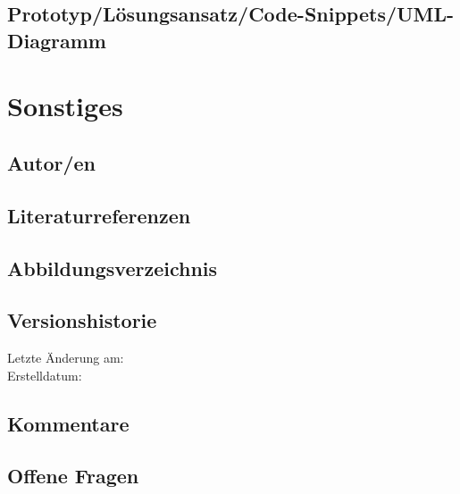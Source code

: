 \technologyOrientationDesc 

\subsection*{Prototyp/Lösungsansatz/Code-Snippets/UML-Diagramm}
\prototype

\begin{figure}[H]
\end{figure}

\begin{figure}[H]
\end{figure}

\begin{figure}[H]
\end{figure}

\begin{figure}[H]
\end{figure}


\section*{Sonstiges}

\subsection*{Autor/en}
\authors

\subsection*{Literaturreferenzen}
\literature


\subsection*{Abbildungsverzeichnis}
\figures

\subsection*{Versionshistorie}
Letzte Änderung am: \versionhistory \\
Erstelldatum: \dateofcreation

\subsection*{Kommentare}
\comments

\subsection*{Offene Fragen}
\questions

